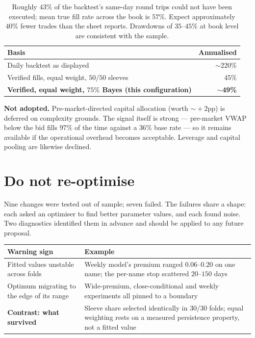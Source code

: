 \documentclass[11pt]{article}
\begin{document}
\begin{table}[H]\centering\small
\renewcommand{\arraystretch}{1.15}
\begin{tabular}{l r}
\toprule
\textbf{Basis} & \textbf{Annualised}\\
\midrule
Daily backtest as displayed & $\sim$220\%\\
\midrule
Verified fills, equal weight, $50/50$ sleeves & 45\%\\
\rowcolor{bckeep} \textbf{Verified, equal weight, $75\%$ Bayes (this configuration)} & \textbf{$\sim$49\%}\\
\bottomrule
\end{tabular}
\caption*{\footnotesize Roughly $43\%$ of the backtest's same-day round trips could not have
been executed; mean true fill rate across the book is $57\%$. Expect approximately $40\%$ fewer
trades than the sheet reports. Drawdowns of $35\text{--}45\%$ at book level are consistent with
the sample.}
\end{table}

\textbf{Not adopted.} Pre-market-directed capital allocation (worth $\sim\!+2$pp) is deferred on
complexity grounds. The signal itself is strong --- pre-market VWAP below the bid fills $97\%$ of
the time against a $36\%$ base rate --- so it remains available if the operational overhead
becomes acceptable. Leverage and capital pooling are likewise declined.

\section{Do not re-optimise}

Nine changes were tested out of sample; seven failed. The failures share a shape: each asked an
optimiser to find better parameter values, and each found noise. Two diagnostics identified them
in advance and should be applied to any future proposal.

\begin{table}[H]\centering\small
\renewcommand{\arraystretch}{1.15}
\begin{tabular}{p{6.4cm} p{6.4cm}}
\toprule
\textbf{Warning sign} & \textbf{Example}\\
\midrule
Fitted values unstable across folds & Weekly model's premium ranged $0.06$--$0.20$ on one name; the per-name stop scattered $20$--$150$ days\\
Optimum migrating to the edge of its range & Wide-premium, close-conditional and weekly experiments all pinned to a boundary\\
\midrule
\textbf{Contrast: what survived} & Sleeve share selected identically in $30/30$ folds; equal weighting rests on a measured persistence property, not a fitted value\\
\bottomrule
\end{tabular}
\end{table}
\end{document}
